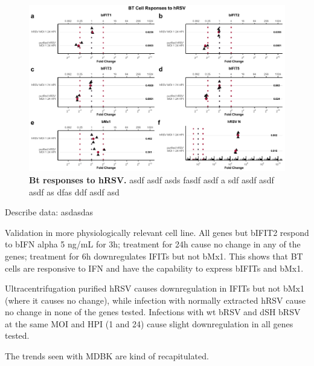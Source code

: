 \begin{figure}
    \centering
    \includegraphics[width=1\linewidth]{07. Chapter 2/Figs/02. Induction/10. bt_hrsv.pdf}
    \caption[Bt responses to hRSV.]{\textbf{Bt responses to hRSV.} asdf asdf asds fasdf asdf a sdf asdf asdf asdf as dfas ddf asdf asd}
    \label{fig:Bt responses to hRSV}
\end{figure}


Describe data: \newline
asdasdas

Validation in more physiologically relevant cell line. All genes but bIFIT2 respond to bIFN alpha 5 ng/mL for 3h; treatment for 24h cause no change in any of the genes; treatment for 6h downregulates IFITs but not bMx1. This shows that BT cells are responsive to IFN and have the capability to express bIFITs and bMx1.

Ultracentrifugation purified hRSV causes downregulation in IFITs but not bMx1 (where it causes no change), while infection with normally extracted hRSV cause no change in none of the genes tested. Infections with wt bRSV and dSH bRSV at the same MOI and HPI (1 and 24) cause slight downregulation in all genes tested.

The trends seen with MDBK are kind of recapitulated.

